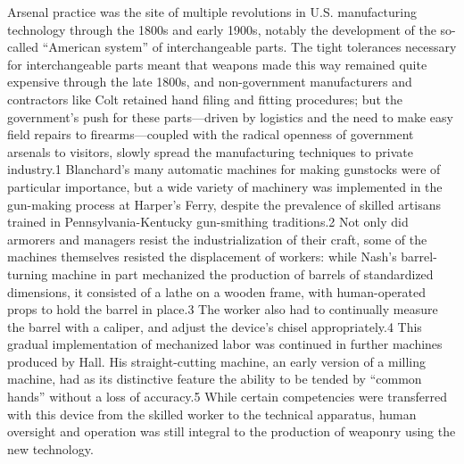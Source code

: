 Arsenal practice was the site of multiple revolutions in U.S.
manufacturing technology through the 1800s and early 1900s, notably
the development of the so-called “American system” of interchangeable
parts. The tight tolerances necessary for interchangeable parts meant
that weapons made this way remained quite expensive through the late
1800s, and non-government manufacturers and contractors like Colt
retained hand filing and fitting procedures; but the government's push
for these parts—driven by logistics and the need to make easy field
repairs to firearms—coupled with the radical openness of government
arsenals to visitors, slowly spread the manufacturing techniques to
private industry.1 Blanchard's many automatic machines for making
gunstocks were of particular importance, but a wide variety of
machinery was implemented in the gun-making process at Harper's Ferry,
despite the prevalence of skilled artisans trained in
Pennsylvania-Kentucky gun-smithing traditions.2 Not only did armorers
and managers resist the industrialization of their craft, some of the
machines themselves resisted the displacement of workers:  while
Nash's barrel-turning machine in part mechanized the production of
barrels of standardized dimensions, it consisted of a lathe on a
wooden frame, with human-operated props to hold the barrel in place.3
The worker also had to continually measure the barrel with a caliper,
and adjust the device's chisel appropriately.4 This gradual
implementation of mechanized labor was continued in further machines
produced by Hall. His straight-cutting machine, an early version of a
milling machine, had as its distinctive feature the ability to be
tended by “common hands” without a loss of accuracy.5 While certain
competencies were transferred with this device from the skilled worker
to the technical apparatus, human oversight and operation was still
integral to the production of weaponry using the new technology.

